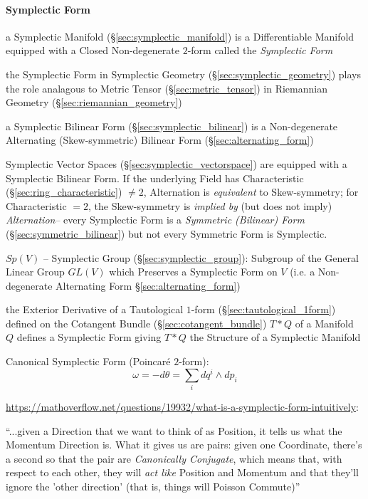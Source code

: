 \paragraph{Symplectic Form}\label{sec:symplectic_form}\hfill


a Symplectic Manifold (\S\ref{sec:symplectic_manifold}) is a Differentiable
Manifold equipped with a Closed Non-degenerate $2$-form called the
\emph{Symplectic Form}

the Symplectic Form in Symplectic Geometry (\S\ref{sec:symplectic_geometry})
plays the role analagous to Metric Tensor (\S\ref{sec:metric_tensor}) in
Riemannian Geometry (\S\ref{sec:riemannian_geometry})

a Symplectic Bilinear Form (\S\ref{sec:symplectic_bilinear}) is a
Non-degenerate Alternating (Skew-symmetric) Bilinear Form
(\S\ref{sec:alternating_form})

Symplectic Vector Spaces (\S\ref{sec:symplectic_vectorspace}) are equipped with
a Symplectic Bilinear Form. If the underlying Field has Characteristic
(\S\ref{sec:ring_characteristic}) $\neq 2$, Alternation is \emph{equivalent} to
Skew-symmetry; for Characteristic $=2$, the Skew-symmetry is \emph{implied by}
(but does not imply) \emph{Alternation}-- every Symplectic Form is a
\emph{Symmetric (Bilinear) Form} (\S\ref{sec:symmetric_bilinear}) but not
every Symmetric Form is Symplectic.

$Sp(V)$ -- Symplectic Group (\S\ref{sec:symplectic_group}): Subgroup of the
General Linear Group $GL(V)$ which Preserves a Symplectic Form on $V$ (i.e. a
Non-degenerate Alternating Form \S\ref{sec:alternating_form})

the Exterior Derivative of a Tautological $1$-form
(\S\ref{sec:tautological_1form}) defined on the Cotangent Bundle
(\S\ref{sec:cotangent_bundle}) $T * Q$ of a Manifold $Q$ defines a Symplectic
Form giving $T * Q$ the Structure of a Symplectic Manifold

Canonical Symplectic Form (Poincar\'e $2$-form):
\[
  \omega = -d\theta = \sum_i dq^i \wedge dp_i
\]

\asterism

\url{https://mathoverflow.net/questions/19932/what-is-a-symplectic-form-intuitively}:

``...given a Direction that we want to think of as Position, it tells us what
the Momentum Direction is. What it gives us are pairs: given one Coordinate,
there's a second so that the pair are \emph{Canonically Conjugate}, which means
that, with respect to each other, they will \emph{act like} Position and
Momentum and that they'll ignore the 'other direction' (that is, things will
Poisson Commute)''

